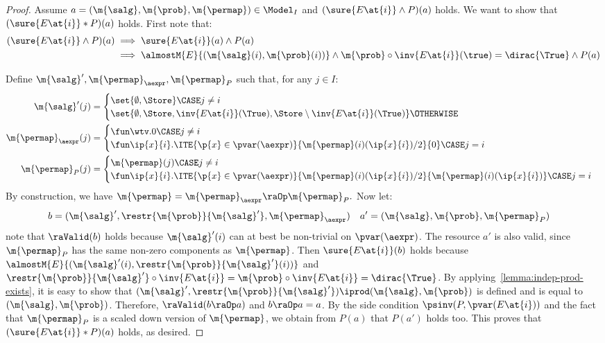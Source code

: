 \documentclass[acmsmall,nonacm,screen,appendix]{acmart}
\begin{document}
\begin{proof}
  Assume $a = (\m{\salg}, \m{\prob}, \m{\permap}) \in \Model_I$ and
  $(\sure{E\at{i}} \land P)(a)$ holds.
  We want to show that
  $(\sure{E\at{i}} \ast P)(a)$ holds.
  First note that:
  \begin{align*}
    (\sure{E\at{i}} \land P)(a)
    & \implies \sure{E\at{i}}(a) \land P(a) \\
    & \implies \almostM{E}{(\m{\salg}(i), \m{\prob}(i))}
    \land \m{\prob} \circ \inv{E\at{i}}(\true) = \dirac{\True}
    \land P(a)
  \end{align*}

  Define $\m{\salg}', \m{\permap}_{\aexpr}, \m{\permap}_{P}$ such that,
  for any $j \in I$:
  \begin{align*}
    \m{\salg}'(j) &=
    \begin{cases}
      \set{\emptyset, \Store} \CASE j \neq i\\
      \set{\emptyset, \Store, \inv{E\at{i}}(\True), \Store \setminus
      \inv{E\at{i}}(\True)} \OTHERWISE
    \end{cases}
    \\
    \m{\permap}_{\aexpr}(j) &=
    \begin{cases}
      \fun \wtv.0 \CASE j \ne i \\
      \fun \ip{x}{i}.
        \ITE{\p{x} \in \pvar(\aexpr)}{\m{\permap}(i)(\ip{x}{i})/2}{0}
    \CASE j = i
    \end{cases}
    \\
    \m{\permap}_{P}(j) &=
    \begin{cases}
      \m{\permap}(j) \CASE j \ne i \\
      \fun \ip{x}{i}.
        \ITE{\p{x} \in \pvar(\aexpr)}{\m{\permap}(i)(\ip{x}{i})/2}{\m{\permap}(i)(\ip{x}{i})}
    \CASE j = i
    \end{cases}
  \end{align*}
  By construction, we have
  $
    \m{\permap} = \m{\permap}_{\aexpr} \raOp \m{\permap}_{P}.
  $
  Now let:
  \begin{align*}
    b &= (\m{\salg}', \restr{\m{\prob}}{\m{\salg}'}, \m{\permap}_{\aexpr})
    &
    a' &= (\m{\salg}, \m{\prob}, \m{\permap}_{P})
  \end{align*}
  note that $\raValid(b)$ holds because $\m{\salg}'(i)$ can at best be non-trivial on $\pvar(\aexpr)$.
  The resource $a'$ is also valid, since $\m{\permap}_{P}$ has the same non-zero components as $\m{\permap}$.
  Then
  $\sure{E\at{i}}(b)$ holds because
  $\almostM{E}{( \m{\salg}'(i), \restr{\m{\prob}}{\m{\salg}'}(i) )}$
  and $\restr{\m{\prob}}{\m{\salg}'} \circ \inv{E\at{i}}
  = \m{\prob} \circ \inv{E\at{i}} = \dirac{\True}$.
  By applying~\cref{lemma:indep-prod-exists}, it is easy to show that
  $(\m{\salg}', \restr{\m{\prob}}{\m{\salg}'}) \iprod (\m{\salg}, \m{\prob})$
  is defined and is equal to $(\m{\salg}, \m{\prob})$.
  Therefore,
  $\raValid(b \raOp a)$ and $b \raOp a = a$.
  By the side condition $\psinv(P, \pvar(E\at{i}))$ and the fact that
  $\m{\permap}_{P}$ is a scaled down version of $\m{\permap}$,
  we obtain from $P(a)$ that $P(a')$ holds too.
  This proves that
  $(\sure{E\at{i}} \ast P)(a)$ holds, as desired.
\end{proof}
\end{document}
